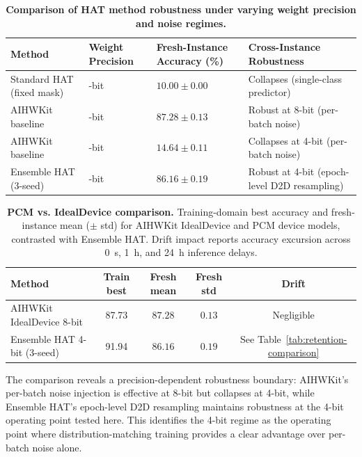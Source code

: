 \begin{table}[ht]
\centering
\caption{\textbf{Comparison of HAT method robustness under varying weight precision and noise regimes.}}
\label{tab:aihwkit-comparison}
\small
\begin{tabular}{@{}>{\raggedright\arraybackslash}p{}>{\centering\arraybackslash}p{}>{\centering\arraybackslash}p{}>{\raggedright\arraybackslash}p{}@{}}
\toprule
\textbf{Method} & \textbf{Weight Precision} & \textbf{Fresh-Instance Accuracy (\%)} & \textbf{Cross-Instance Robustness} \\
\midrule
Standard HAT (fixed mask) & 4-bit & $10.00 \pm 0.00$ & Collapses (single-class predictor) \\
AIHWKit baseline \citep{rasch2021aihwkit} & 8-bit & $87.28 \pm 0.13$ & Robust at 8-bit (per-batch noise) \\
AIHWKit baseline \citep{rasch2021aihwkit} & 4-bit & $14.64 \pm 0.11$ & Collapses at 4-bit (per-batch noise) \\
Ensemble HAT (3-seed) & 4-bit & $86.16 \pm 0.19$ & Robust at 4-bit (epoch-level D2D resampling) \\
\bottomrule
\end{tabular}
\end{table}

\begin{table}[ht]
\centering
\caption{\textbf{PCM vs. IdealDevice comparison.} Training-domain best accuracy and fresh-instance mean ($\pm$ std) for AIHWKit IdealDevice and PCM device models, contrasted with Ensemble HAT. Drift impact reports accuracy excursion across 0~s, 1~h, and 24~h inference delays.}
\label{tab:pcm-comparison}
\footnotesize
\setlength{\tabcolsep}{3pt}
\begin{tabular}{@{}p{}cccc@{}}
\toprule
\textbf{Method} & \textbf{Train best} & \textbf{Fresh mean} & \textbf{Fresh std} & \textbf{Drift} \\
\midrule
AIHWKit IdealDevice 8-bit~\citep{rasch2021aihwkit} & 87.73 & $87.28$ & $0.13$ & Negligible \\
Ensemble HAT 4-bit (3-seed) & 91.94 & $86.16$ & $0.19$ & See Table~\ref{tab:retention-comparison} \\
\bottomrule
\end{tabular}
\end{table}

The comparison reveals a precision-dependent robustness boundary: AIHWKit's per-batch noise injection is effective at 8-bit but collapses at 4-bit, while Ensemble HAT's epoch-level D2D resampling maintains robustness at the 4-bit operating point tested here. This identifies the 4-bit regime as the operating point where distribution-matching training provides a clear advantage over per-batch noise alone.

